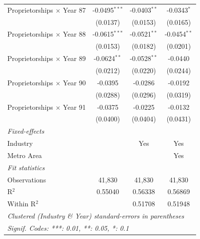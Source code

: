 \documentclass[
  12pt]{article}
\begin{document}
\begin{table}
\begin{minipage}{\linewidth}
\begin{tabular}{lccc}
   Proprietorships $\times$ Year 87  & -0.0495$^{***}$ & -0.0403$^{**}$ & -0.0343$^{*}$\\   
                                     & (0.0137)        & (0.0153)       & (0.0165)\\   
   Proprietorships $\times$ Year 88  & -0.0615$^{***}$ & -0.0521$^{**}$ & -0.0454$^{**}$\\   
                                     & (0.0153)        & (0.0182)       & (0.0201)\\   
   Proprietorships $\times$ Year 89  & -0.0624$^{**}$  & -0.0528$^{**}$ & -0.0440\\   
                                     & (0.0212)        & (0.0220)       & (0.0244)\\   
   Proprietorships $\times$ Year 90  & -0.0395         & -0.0286        & -0.0192\\   
                                     & (0.0288)        & (0.0296)       & (0.0319)\\   
   Proprietorships $\times$ Year 91  & -0.0375         & -0.0225        & -0.0132\\   
                                     & (0.0400)        & (0.0404)       & (0.0431)\\   
   \midrule
   \emph{Fixed-effects}\\
   Industry                          &                 & Yes            & Yes\\  
   Metro Area                        &                 &                & Yes\\  
   \midrule
   \emph{Fit statistics}\\
   Observations                      & 41,830          & 41,830         & 41,830\\  
   R$^2$                             & 0.55040         & 0.56338        & 0.56869\\  
   Within R$^2$                      &                 & 0.51708        & 0.51948\\  
   \midrule \midrule
   \multicolumn{4}{l}{\emph{Clustered (Industry \& Year) standard-errors in parentheses}}\\
   \multicolumn{4}{l}{\emph{Signif. Codes: ***: 0.01, **: 0.05, *: 0.1}}\\
\end{tabular}

\end{minipage}%
\newline
\begin{minipage}{\linewidth}


\end{minipage}
\end{table}
\end{document}
